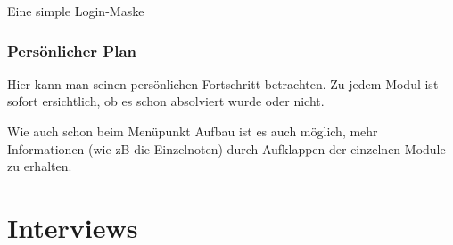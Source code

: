 \documentclass[a4paper,10pt]{scrartcl}
\begin{document}
Eine simple Login-Maske

\subsubsection{Persönlicher Plan}

\noindent{}
\medskip

Hier kann man seinen persönlichen Fortschritt betrachten. Zu jedem Modul ist sofort ersichtlich, ob es schon absolviert wurde oder nicht.

\medskip
\noindent{}
\medskip

Wie auch schon beim Menüpunkt Aufbau ist es auch möglich, mehr Informationen (wie zB die Einzelnoten) durch Aufklappen der einzelnen Module zu erhalten.

\section{Interviews}

\end{document}

